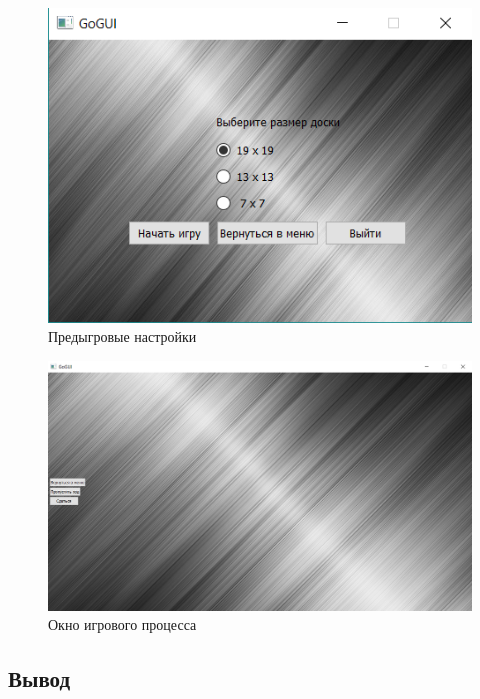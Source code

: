 \begin{figure}[H]
	\begin{center}
		\includegraphics[scale=0.6]{pics/GoGUI/Settings.png}
	    \caption{Предыгровые настройки} 
		\label{pic:CUI_Settings}
	\end{center}
\end{figure}

\begin{figure}[H]
	\begin{center}
		\includegraphics[scale=0.5]{pics/GoGUI/Game.png}
	    \caption{Окно игрового процесса} 
		\label{pic:CUI_Game}
	\end{center}
\end{figure}

\subsection*{Вывод}

